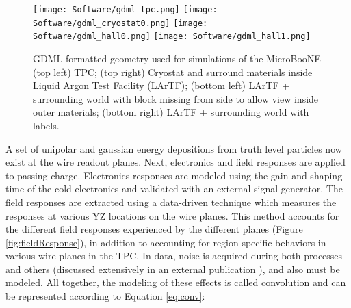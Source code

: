 \begin{figure}[H]
\centering
\texttt{[image: Software/gdml\_tpc.png]}
\hspace{2 mm}
\texttt{[image: Software/gdml\_cryostat0.png]}
\hspace{2 mm}
\texttt{[image: Software/gdml\_hall0.png]}
\hspace{2 mm}
\texttt{[image: Software/gdml\_hall1.png]}
\caption{GDML formatted geometry used for simulations of the MicroBooNE (top left) TPC; (top right) Cryostat and surround materials inside Liquid Argon Test Facility (LArTF); (bottom left) LArTF + surrounding world with block missing from side to allow view inside outer materials; (bottom right) LArTF + surrounding world with labels. }
\label{fig:gdml}
\end{figure}


\par  A set of unipolar and gaussian energy depositions from truth level particles now exist at the wire readout planes. Next, electronics and field responses are applied to passing charge.  Electronics responses are modeled using the gain and shaping time of the cold electronics and validated with an external signal generator.  The field responses are extracted using a data-driven technique which measures the responses at various YZ locations on the wire planes. This method accounts for the different field responses experienced by the different planes (Figure \ref{fig:fieldResponse}), in addition to accounting for region-specific behaviors in various wire planes in the TPC. In data, noise is acquired during both processes and others (discussed extensively in an external publication \cite{bib:noise}), and also must be modeled.  All together, the modeling of these effects is called convolution and can be represented according to Equation \ref{eq:conv}:

